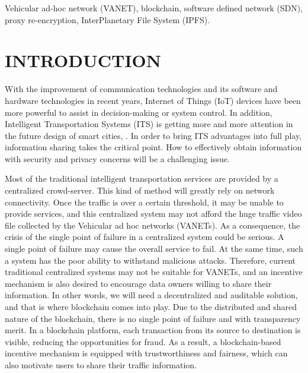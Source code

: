 \documentclass[journal,10pt]{IEEEtran}
\begin{document}
\begin{IEEEkeywords}
Vehicular ad-hoc network (VANET), blockchain, software defined network (SDN), proxy re-encryption, InterPlanetary File System (IPFS).
\end{IEEEkeywords}


\IEEEpeerreviewmaketitle



\section{INTRODUCTION}
With the improvement of communication technologies and its software and hardware technologies in recent years, Internet of Things (IoT) devices have been more powerful to assist in decision-making or system control.
In addition, Intelligent Transportation Systems (ITS) is getting more and more attention in the future design of smart cities\cite{Survey on various mechanisms for Secure and Efficient VANET communication}, \cite{Blockchain based intelligent vehicle data sharing framework}.
In order to bring ITS advantages into full play, information sharing takes the critical point.
How to effectively obtain information with security and privacy concerns will be a challenging issue\cite{Security Issues inVehicular Ad-hoc Network(VANET)}\cite{Securing vehicular ad hoc networks}.

Most of the traditional intelligent transportation services are provided by a centralized crowd-server.
This kind of method will greatly rely on network connectivity. Once the traffic is over a certain threshold, it may be unable to provide services, and this centralized system may not afford the huge traffic video file collected by the Vehicular ad hoc networks (VANETs). As a consequence, the crisis of the single point of failure in a centralized system could be serious.
A single point of failure may cause the overall service to fail. At the same time, such a system has the poor ability to withstand malicious attacks. Therefore, current traditional centralized systems may not be suitable for VANETs, and an incentive mechanism is also desired to encourage data owners willing to share their information.
In other words, we will need a decentralized and auditable solution, and that is where blockchain comes into play\cite{Blockchain technology on the way of autonomous vehicles development}. Due to the distributed and shared nature of the blockchain, there is no single point of failure and with transparency merit. In a blockchain platform, each transaction from its source to destination is visible, reducing the opportunities for fraud. As a result, a blockchain-based incentive mechanism is equipped with trustworthiness and fairness, which can also motivate users to share their traffic information.
\end{document}
